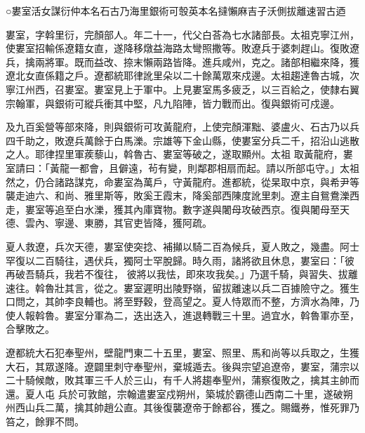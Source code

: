 
\begin{pinyinscope}

 ○婁室活女謀衍仲本名石古乃海里銀術可彀英本名撻懶麻吉子沃側拔離速習古迺



 婁室，字斡里衍，完顏部人。年二十一，代父白荅為七水諸部長。太祖克寧江州，使婁室招輸係遼籍女直，遂降移燉益海路太彎照撒等。敗遼兵于婆刺趕山。復敗遼
 兵，擒兩將軍。既而益改、捺末懶兩路皆降。進兵咸州，克之。諸部相繼來降，獲遼北女直係籍之戶。遼都統耶律訛里朵以二十餘萬眾來戍邊。太祖趨達魯古城，次寧江州西，召婁室。婁室見上于軍中。上見婁室馬多疲乏，以三百給之，使隸右翼宗翰軍，與銀術可縱兵衝其中堅，凡九陷陣，皆力戰而出。復與銀術可戍邊。



 及九百奚營等部來降，則與銀術可攻黃龍府，上使完顏渾黜、婆盧火、石古乃以兵四千助之，敗遼兵萬餘于白馬濼。宗雄等下金山縣，使婁室分兵二千，招沿山逃散之人。耶律捏里軍蒺藜山，斡魯古、婁室等破之，遂取顯州。太祖
 取黃龍府，婁室請曰：「黃龍一都會，且僻遠，茍有變，則鄰郡相扇而起。請以所部屯守。」太祖然之，仍合諸路謀克，命婁室為萬戶，守黃龍府。進都統，從杲取中京，與希尹等襲走迪六、和尚、雅里斯等，敗奚王霞末，降奚部西陳度訛里刺。遼主自鴛鴦濼西走，婁室等追至白水濼，獲其內庫寶物。數字遂與闍母攻破西京。復與闍母至天德、雲內、寧邊、東勝，其官吏皆降，獲阿疏。



 夏人救遼，兵次天德，婁室使突捻、補攧以騎二百為候兵，夏人敗之，幾盡。阿士罕復以二百騎往，遇伏兵，獨阿士罕脫歸。時久雨，諸將欲且休息，婁室曰：「彼再破吾騎兵，我若不復往，
 彼將以我怯，即來攻我矣。」乃選千騎，與習失、拔離速往。斡魯壯其言，從之。婁室遲明出陵野嶺，留拔離速以兵二百據險守之。獲生口問之，其帥李良輔也。將至野穀，登高望之。夏人恃眾而不整，方濟水為陣，乃使人報斡魯。婁室分軍為二，迭出迭入，進退轉戰三十里。過宜水，斡魯軍亦至，合擊敗之。



 遼都統大石犯奉聖州，壁龍門東二十五里，婁室、照里、馬和尚等以兵取之，生獲大石，其眾遂降。遼闢里刺守奉聖州，棄城遁去。後與宗望追遼帝，婁室，蒲宗以二十騎候敵，敗其軍三千人於三山，有千人將趨奉聖州，蒲察復敗之，擒其主帥而還。夏人屯
 兵於可敦館，宗翰遣婁室戍朔州，築城於霸德山西南二十里，遂破朔州西山兵二萬，擒其帥趙公直。其後復襲遼帝于餘都谷，獲之。賜鐵券，惟死罪乃笞之，餘罪不問。




\end{pinyinscope}

